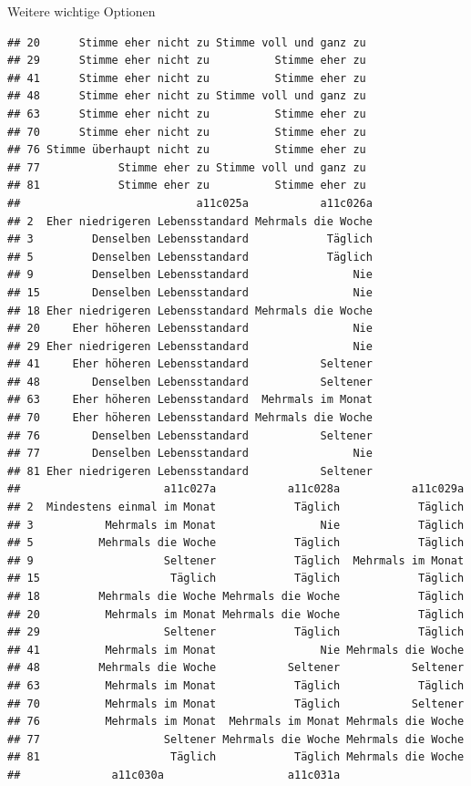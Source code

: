 \documentclass[ignorenonframetext,]{beamer}
\begin{document}
\begin{frame}[fragile]{Weitere wichtige Optionen}
\begin{verbatim}
## 20      Stimme eher nicht zu Stimme voll und ganz zu
## 29      Stimme eher nicht zu          Stimme eher zu
## 41      Stimme eher nicht zu          Stimme eher zu
## 48      Stimme eher nicht zu Stimme voll und ganz zu
## 63      Stimme eher nicht zu          Stimme eher zu
## 70      Stimme eher nicht zu          Stimme eher zu
## 76 Stimme überhaupt nicht zu          Stimme eher zu
## 77            Stimme eher zu Stimme voll und ganz zu
## 81            Stimme eher zu          Stimme eher zu
##                           a11c025a           a11c026a
## 2  Eher niedrigeren Lebensstandard Mehrmals die Woche
## 3         Denselben Lebensstandard            Täglich
## 5         Denselben Lebensstandard            Täglich
## 9         Denselben Lebensstandard                Nie
## 15        Denselben Lebensstandard                Nie
## 18 Eher niedrigeren Lebensstandard Mehrmals die Woche
## 20     Eher höheren Lebensstandard                Nie
## 29 Eher niedrigeren Lebensstandard                Nie
## 41     Eher höheren Lebensstandard           Seltener
## 48        Denselben Lebensstandard           Seltener
## 63     Eher höheren Lebensstandard  Mehrmals im Monat
## 70     Eher höheren Lebensstandard Mehrmals die Woche
## 76        Denselben Lebensstandard           Seltener
## 77        Denselben Lebensstandard                Nie
## 81 Eher niedrigeren Lebensstandard           Seltener
##                      a11c027a           a11c028a           a11c029a
## 2  Mindestens einmal im Monat            Täglich            Täglich
## 3           Mehrmals im Monat                Nie            Täglich
## 5          Mehrmals die Woche            Täglich            Täglich
## 9                    Seltener            Täglich  Mehrmals im Monat
## 15                    Täglich            Täglich            Täglich
## 18         Mehrmals die Woche Mehrmals die Woche            Täglich
## 20          Mehrmals im Monat Mehrmals die Woche            Täglich
## 29                   Seltener            Täglich            Täglich
## 41          Mehrmals im Monat                Nie Mehrmals die Woche
## 48         Mehrmals die Woche           Seltener           Seltener
## 63          Mehrmals im Monat            Täglich            Täglich
## 70          Mehrmals im Monat            Täglich           Seltener
## 76          Mehrmals im Monat  Mehrmals im Monat Mehrmals die Woche
## 77                   Seltener Mehrmals die Woche Mehrmals die Woche
## 81                    Täglich            Täglich Mehrmals die Woche
##              a11c030a                   a11c031a

\end{verbatim}
\end{frame}
\end{document}
